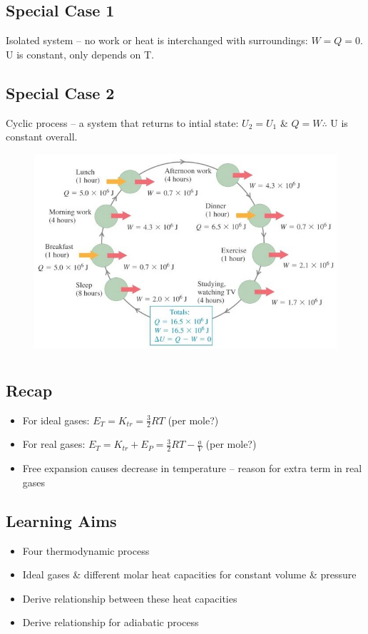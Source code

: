 \documentclass[a4paper, 11pt, normalem]{report}
\begin{document}
\section{Special Case 1}
Isolated system -- no work or heat is interchanged with surroundings: $W = Q = 0$.
U is constant, only depends on T.

\section{Special Case 2}
Cyclic process -- a system that returns to intial state: $U_{2} = U_{1}$ \& $Q = W \therefore$ U is constant overall.
\begin{figure}[H]
    \centering
    \includegraphics[scale=0.9]{Cyclic.jpg}
\end{figure}

\chapter{}
\section{Recap}
\begin{itemize}
    \item For ideal gases: $E_{T} = K_{tr} = \frac{3}{2}RT$ (per mole?) 
    \item For real gases: $E_{T} = K_{tr} + E_{P} = \frac{3}{2}RT - \frac{a}{V}$ (per mole?) 
    \item Free expansion causes decrease in temperature -- reason for extra term in real gases
\end{itemize}

\section{Learning Aims}
\begin{itemize}
	\item Four thermodynamic process
	\item Ideal gases \&  different molar heat capacities for constant volume \& pressure
	\item Derive relationship between these heat capacities
	\item Derive relationship for adiabatic process
\end{itemize}
\end{document}

